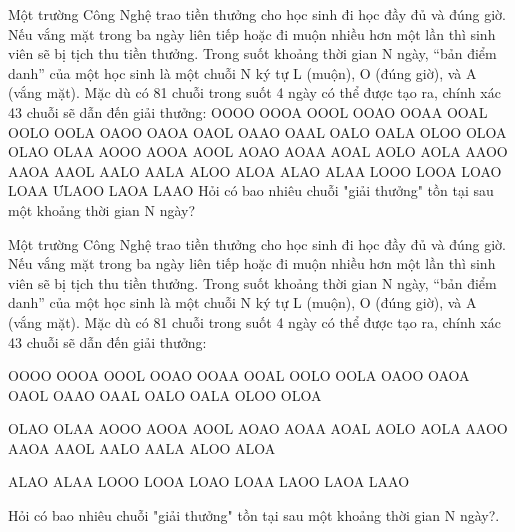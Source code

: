 Một trường Công Nghệ trao tiền thưởng cho học sinh đi học đầy đủ và đúng giờ. Nếu vắng mặt       trong ba ngày liên tiếp hoặc đi muộn nhiều hơn một lần thì sinh viên sẽ bị tịch thu tiền thưởng.       Trong suốt khoảng thời gian N ngày, “bản điểm danh” của một học sinh là một chuỗi N ký tự L       (muộn), O (đúng giờ), và A (vắng mặt).       Mặc dù có 81 chuỗi trong suốt 4 ngày có thể được tạo ra, chính xác 43 chuỗi sẽ dẫn đến giải       thưởng:       OOOO OOOA OOOL OOAO OOAA OOAL OOLO OOLA OAOO OAOA OAOL OAAO OAAL OALO OALA OLOO OLOA       OLAO OLAA AOOO AOOA AOOL AOAO AOAA AOAL AOLO AOLA AAOO AAOA AAOL AALO AALA ALOO ALOA ALAO       ALAA LOOO LOOA LOAO LOAA ƯLAOO LAOA LAAO       Hỏi có bao nhiêu chuỗi "giải thưởng" tồn tại sau một khoảng thời gian N ngày?    

   Một trường Công Nghệ trao tiền thưởng cho học sinh đi học đầy đủ và đúng giờ. Nếu vắng mặt trong ba ngày liên tiếp hoặc đi muộn nhiều hơn một lần thì sinh viên sẽ bị tịch thu tiền thưởng. Trong suốt khoảng thời gian N ngày, “bản điểm danh” của một học sinh là một chuỗi N ký tự L (muộn), O (đúng giờ), và A (vắng mặt). Mặc dù có 81 chuỗi trong suốt 4 ngày có thể được tạo ra, chính xác 43 chuỗi sẽ dẫn đến giải thưởng:  

   OOOO OOOA OOOL OOAO OOAA OOAL OOLO OOLA OAOO OAOA OAOL OAAO OAAL OALO OALA OLOO OLOA  

   OLAO OLAA AOOO AOOA AOOL AOAO AOAA AOAL AOLO AOLA AAOO AAOA AAOL AALO AALA ALOO ALOA  

   ALAO ALAA LOOO LOOA LOAO LOAA LAOO LAOA LAAO  

   Hỏi có bao nhiêu chuỗi "giải thưởng" tồn tại sau một khoảng thời gian N ngày?.